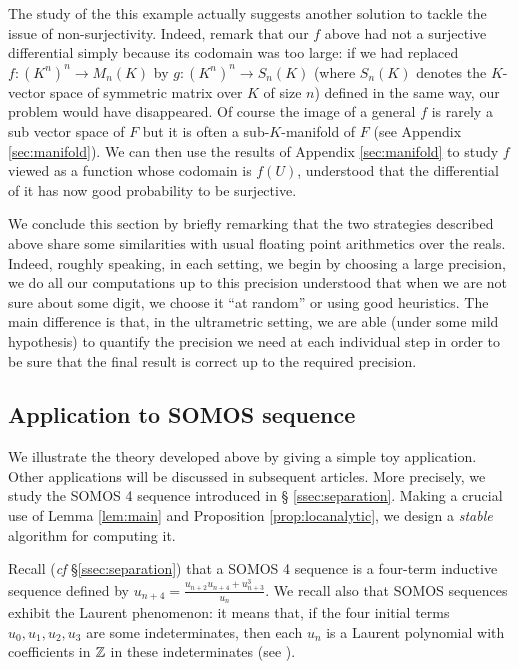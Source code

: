 \documentclass{lms}
\begin{document}
The study of the this example actually suggests another solution to 
tackle the issue of non-surjectivity. Indeed, remark that our $f$ above 
had not a surjective differential simply because its codomain was too 
large: if we had replaced $f : (K^n)^n \to M_n(K)$ by $g : (K^n)^n \to 
S_n(K)$ (where $S_n(K)$ denotes the $K$-vector space of symmetric matrix 
over $K$ of size $n$) defined in the same way, our problem would have 
disappeared. Of course the image of a general $f$ is rarely a sub vector 
space of $F$ but it is often a sub-$K$-manifold of $F$ (see Appendix
\ref{sec:manifold}). We can then use 
the results of Appendix \ref{sec:manifold} to study $f$ viewed as a 
function whose codomain is $f(U)$, understood that the differential of 
it has now good probability to be surjective.

\medskip

We conclude this section by briefly remarking that the two strategies described 
above share some 
similarities with usual floating point arithmetics over the reals. 
Indeed, roughly speaking, in each setting, we begin by choosing a large 
precision, we do all our computations up to this precision understood 
that when we are not sure about some digit, we choose it ``at random'' 
or using good heuristics. The main difference is that, in the 
ultrametric setting, we are able (under some mild hypothesis) to 
quantify the precision we need at each individual step in order to be 
sure that the final result is correct up to the required precision.

\subsection{Application to SOMOS sequence}
\label{ssec:SOMOS-solution}

We illustrate the theory developed above by giving a simple 
toy application. Other applications will be discussed in subsequent 
articles. More precisely, we study the SOMOS 4 sequence introduced in \S 
\ref{ssec:separation}. Making a crucial use of Lemma \ref{lem:main} and 
Proposition \ref{prop:locanalytic}, we design a \emph{stable} algorithm 
for computing it.

Recall (\emph{cf} \S \ref{ssec:separation}) that a SOMOS 4 sequence is a 
four-term inductive sequence defined by $u_{n+4} = \frac{u_{n+2} u_{n+4} 
+ u_{n+3}^3}{u_n}$. We recall also that SOMOS sequences exhibit the 
Laurent phenomenon: it means that, if the four initial terms $u_0, u_1, 
u_2, u_3$ are some indeterminates, then each $u_n$ is a Laurent 
polynomial with coefficients in $\mathbb Z$ in these indeterminates
(see \cite{fomin-zelevinsky:02a}).
\end{document}
